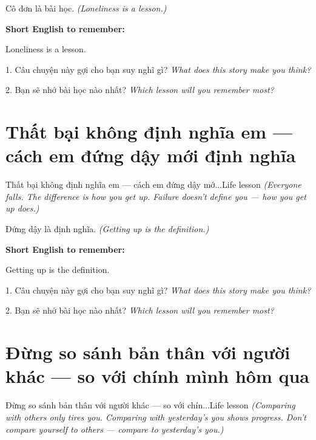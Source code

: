 \begin{baihoc}
Cô đơn là bài học.
\textit{(Loneliness is a lesson.)}
\end{baihoc}

\begin{ghinhoanh}
\textbf{Short English to remember:}

Loneliness is a lesson.

\end{ghinhoanh}

\begin{tuhocnhanh}
1. Câu chuyện này gợi cho bạn suy nghĩ gì? \textit{What does this story make you think?}

2. Bạn sẽ nhớ bài học nào nhất? \textit{Which lesson will you remember most?}
\end{tuhocnhanh}
\ngancach


\section{Thất bại không định nghĩa em — cách em đứng dậy mới định nghĩa}
\begin{truyen}{Thất bại không định nghĩa em — cách em đứng dậy mớ...}{Life lesson}
\textit{(Everyone falls. The difference is how you get up. Failure doesn't define you — how you get up does.)}
\end{truyen}

\begin{baihoc}
Đứng dậy là định nghĩa.
\textit{(Getting up is the definition.)}
\end{baihoc}

\begin{ghinhoanh}
\textbf{Short English to remember:}

Getting up is the definition.

\end{ghinhoanh}

\begin{tuhocnhanh}
1. Câu chuyện này gợi cho bạn suy nghĩ gì? \textit{What does this story make you think?}

2. Bạn sẽ nhớ bài học nào nhất? \textit{Which lesson will you remember most?}
\end{tuhocnhanh}
\ngancach


\section{Đừng so sánh bản thân với người khác — so với chính mình hôm qua}
\begin{truyen}{Đừng so sánh bản thân với người khác — so với chín...}{Life lesson}
\textit{(Comparing with others only tires you. Comparing with yesterday's you shows progress. Don't compare yourself to others — compare to yesterday's you.)}
\end{truyen}

